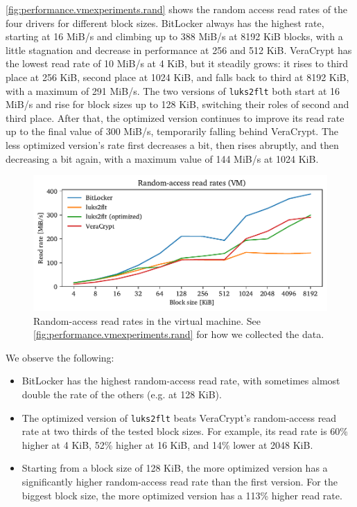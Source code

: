 \autoref{fig:performance.vmexperiments.rand} shows the random access read rates of the four drivers for different block sizes. BitLocker always has the highest rate, starting at 16 MiB/s and climbing up to 388 MiB/s at 8192 KiB blocks, with a little stagnation and decrease in performance at 256 and 512 KiB. VeraCrypt has the lowest read rate of 10 MiB/s at 4 KiB, but it steadily grows: it rises to third place at 256 KiB, second place at 1024 KiB, and falls back to third at 8192 KiB, with a maximum of 291 MiB/s. The two versions of \texttt{luks2flt} both start at 16 MiB/s and rise for block sizes up to 128 KiB, switching their roles of second and third place. After that, the optimized version continues to improve its read rate up to the final value of 300 MiB/s, temporarily falling behind VeraCrypt. The less optimized version's rate first decreases a bit, then rises abruptly, and then decreasing a bit again, with a maximum value of 144 MiB/s at 1024 KiB.

\begin{figure}[htb!]
	\center
	\includegraphics[scale=1]{../fig/performance.vmexperiments.rand.pdf}
	\caption[
		Random-access read rates in the virtual machine
	]{
		Random-access read rates in the virtual machine. See \autoref{fig:performance.vmexperiments.rand} for how we collected the data.
	}
	\label{fig:performance.vmexperiments.rand}
\end{figure}

We observe the following:
\begin{itemize}[beginpenalty=10000]
	\item BitLocker has the highest random-access read rate, with sometimes almost double the rate of the others (e.g. at 128 KiB).
	\item The optimized version of \texttt{luks2flt} beats VeraCrypt's random-access read rate at two thirds of the tested block sizes. For example, its read rate is 60\% higher at 4 KiB, 52\% higher at 16 KiB, and 14\% lower at 2048 KiB.
	\item Starting from a block size of 128 KiB, the more optimized version has a significantly higher random-access read rate than the first version. For the biggest block size, the more optimized version has a 113\% higher read rate.
\end{itemize}

